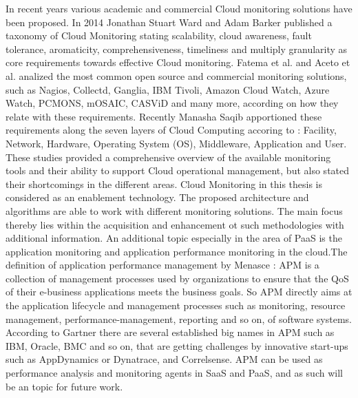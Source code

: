 In recent years various academic and commercial Cloud monitoring solutions have been proposed. In 2014 Jonathan Stuart Ward and Adam Barker \cite{ward2014observing} published a taxonomy of Cloud Monitoring stating scalability, cloud awareness, fault tolerance, aromaticity, comprehensiveness, timeliness and multiply granularity as core requirements towards effective Cloud monitoring. Fatema et al. \cite{fatema2014survey} and Aceto et al. \cite{aceto2013cloud} analized the most common open source and commercial monitoring solutions, such as Nagios, Collectd, Ganglia, IBM Tivoli, Amazon Cloud Watch, Azure Watch, PCMONS, mOSAIC, CASViD and many more, according on how they relate with these requirements. Recently Manasha Saqib \cite{saqib2017cloud} apportioned these requirements along the seven layers of Cloud Computing accoring to \cite{CSA3.0} \cite{spring2011monitoring1} \cite{spring2011monitoring2}: Facility, Network, Hardware, Operating System (OS), Middleware, Application and User. These studies provided a comprehensive overview of the available monitoring tools and their ability to support Cloud operational management, but also stated their shortcomings in the different areas. Cloud Monitoring in this thesis is considered as an enablement technology. The proposed architecture and algorithms are able to work with different monitoring solutions. The main focus thereby lies within the acquisition and enhancement ot such methodologies with additional information.
An additional topic especially in the area of PaaS is the application monitoring and application performance monitoring in the cloud.The definition of application performance management by Menasce \cite{menasce2002load}: APM is a collection of management processes used by organizations to ensure that the QoS of their e-business applications meets the business goals. So APM directly aims at the application lifecycle and management processes such as monitoring, resource management, performance-management, reporting and so on, of software systems. According to Gartner \cite{GartnerAPM} there are several established big names in APM such as IBM, Oracle, BMC and so on, that are getting challenges by innovative start-ups such as AppDynamics or Dynatrace, and Correlsense. APM can be used as performance analysis and monitoring agents in SaaS and PaaS, and as such will be an topic for future work.


